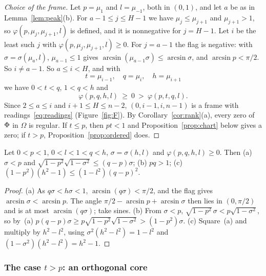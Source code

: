 \begin{proof}[Choice of the frame]
Let $p=\mu_1$ and $l=\mu_{-1}$, both in $(0,1)$, and let $a$ be as in
Lemma~\ref{lem:peak}(b). For $a-1\le j\le H-1$ we have
$\mu_j\le\mu_{j+1}$ and $\mu_{j+1}>1$, so $\varphi(p,\mu_j,\mu_{j+1},l)$ is
defined, and it is nonnegative for $j=H-1$. Let $i$ be the least such $j$ with
$\varphi(p,\mu_j,\mu_{j+1},l)\ge0$. For $j=a-1$ the flag is negative: with
$\sigma=\sigma(\mu_a,l)$, $\mu_{a-1}\le1$ gives
$\arcsin(\mu_{a-1}\sigma)\le\arcsin\sigma$, and $\arcsin p<\pi/2$. So
$i\ne a-1$. So $a\le i<H$, and with
\[
  t=\mu_{i-1},\quad q=\mu_i,\quad h=\mu_{i+1}
\]
we have $0<t<q$, $1<q<h$ and
\begin{equation}\label{eq:transition}
  \varphi(p,q,h,l)\ \ge\ 0\ >\ \varphi(p,t,q,l).
\end{equation}
Since $2\le a\le i$ and $i+1\le H\le n-2$, $(0,i-1,i,n-1)$ is a frame with
readings~\eqref{eq:readings} (Figure~\ref{fig:F}). By
Corollary~\ref{cor:rank}(a), every zero of $\Phi$ in $\Omega$ is regular.
If $t\le p$, then $pt<1$ and Proposition~\ref{prop:chart} below gives a zero;
if $t>p$, Proposition~\ref{prop:ordered} does.
\end{proof}

\begin{lemma}\label{lem:flag}
Let $0<p<1$, $0<l<1<q<h$, $\sigma=\sigma(h,l)$ and $\varphi(p,q,h,l)\ge0$.
Then
\textup{(a)} $\sigma<p$ and $\sqrt{1-p^2}\sqrt{1-\sigma^2}\le(q-p)\sigma$;
\textup{(b)} $pq>1$;
\textup{(c)} $(1-p^2)(h^2-1)\le(1-l^2)(q-p)^2$.
\end{lemma}

\begin{proof}
(a) As $q\sigma<h\sigma<1$, $\arcsin(q\sigma)<\pi/2$, and the flag gives
$\arcsin\sigma<\arcsin p$. The angle $\pi/2-\arcsin p+\arcsin\sigma$ then lies
in $(0,\pi/2)$ and is at most $\arcsin(q\sigma)$; take sines.
(b) From $\sigma<p$, $\sqrt{1-p^2}\,\sigma<p\sqrt{1-\sigma^2}$, so by~(a)
$p(q-p)\sigma\ge p\sqrt{1-p^2}\sqrt{1-\sigma^2}>(1-p^2)\sigma$.
(c) Square~(a) and multiply by $h^2-l^2$, using $\sigma^2(h^2-l^2)=1-l^2$ and
$(1-\sigma^2)(h^2-l^2)=h^2-1$.
\end{proof}

\subsubsection*{The case $t>p$: an orthogonal core}

